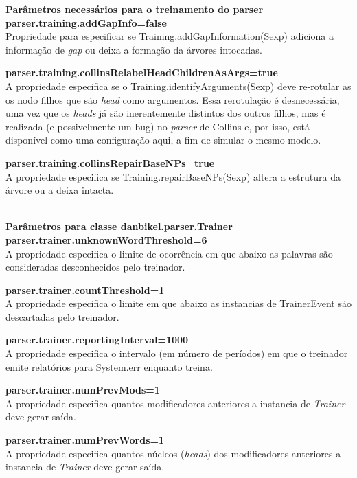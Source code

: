 \textbf{Parâmetros necessários para o treinamento do parser}\\

\textbf{parser.training.addGapInfo=false}\\
Propriedade para especificar se Training.addGapInformation(Sexp) adiciona a informação de \emph{gap} ou deixa a formação da árvores intocadas.

\textbf{parser.training.collinsRelabelHeadChildrenAsArgs=true}\\
A propriedade especifica se o Training.identifyArguments(Sexp) deve re-rotular as os nodo filhos que são \emph{head} como argumentos. Essa rerotulação é desnecessária, uma vez que os \emph{heads} já são inerentemente distintos dos outros filhos, mas é realizada (e possivelmente um bug) no \emph{parser} de Collins e, por isso, está disponível como uma configuração aqui, a fim de simular o mesmo modelo.

\textbf{parser.training.collinsRepairBaseNPs=true}\\
A propriedade especifica se Training.repairBaseNPs(Sexp) altera a estrutura da árvore ou a deixa intacta.

\HRule \\

\textbf{Parâmetros para classe danbikel.parser.Trainer}\\

\textbf{parser.trainer.unknownWordThreshold=6}\\
A propriedade especifica o limite de ocorrência em que abaixo as palavras são consideradas desconhecidos pelo treinador.

\textbf{parser.trainer.countThreshold=1}\\
A propriedade especifica o limite em que abaixo as instancias de TrainerEvent são descartadas pelo treinador.

\textbf{parser.trainer.reportingInterval=1000}\\
A propriedade especifica o intervalo (em número de períodos) em que o treinador emite relatórios para System.err enquanto treina.

\textbf{parser.trainer.numPrevMods=1}\\
A propriedade especifica quantos modificadores anteriores a instancia de \emph{Trainer} deve gerar saída.

\textbf{parser.trainer.numPrevWords=1}\\
A propriedade especifica quantos núcleos (\emph{heads}) dos modificadores anteriores a instancia de \emph{Trainer} deve gerar saída.

